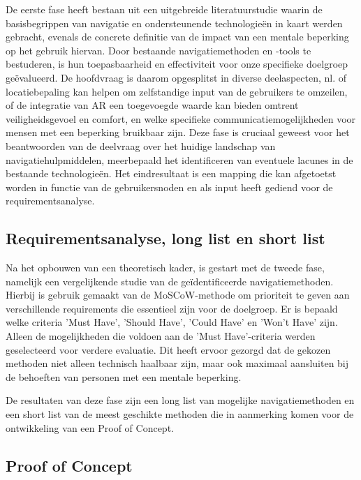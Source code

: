 De eerste fase heeft bestaan uit een uitgebreide literatuurstudie waarin de basisbegrippen van navigatie en ondersteunende technologieën in kaart werden gebracht, evenals de concrete definitie van de impact van een mentale beperking op het gebruik hiervan. Door bestaande navigatiemethoden en -tools te bestuderen, is hun toepasbaarheid en effectiviteit voor onze specifieke doelgroep geëvalueerd. De hoofdvraag is daarom opgesplitst in diverse deelaspecten, nl. of locatiebepaling kan helpen om zelfstandige input van de gebruikers te omzeilen, of de integratie van AR een toegevoegde waarde kan bieden omtrent veiligheidsgevoel en comfort, en welke specifieke communicatiemogelijkheden voor mensen met een beperking bruikbaar zijn. Deze fase is cruciaal geweest voor het beantwoorden van de deelvraag over het huidige landschap van navigatiehulpmiddelen, meerbepaald het identificeren van eventuele lacunes in de bestaande technologieën. Het eindresultaat is een mapping die kan afgetoetst worden in functie van de gebruikersnoden en als input heeft gediend voor de requirementsanalyse.

\subsection*{Requirementsanalyse, long list en short list}

Na het opbouwen van een theoretisch kader, is gestart met de tweede fase, namelijk een vergelijkende studie van de geïdentificeerde navigatiemethoden. Hierbij is gebruik gemaakt van de MoSCoW-methode om prioriteit te geven aan verschillende requirements die essentieel zijn voor de doelgroep. Er is bepaald welke criteria 'Must Have', 'Should Have', 'Could Have' en 'Won't Have' zijn. Alleen de mogelijkheden die voldoen aan de 'Must Have'-criteria werden geselecteerd voor verdere evaluatie. Dit heeft ervoor gezorgd dat de gekozen methoden niet alleen technisch haalbaar zijn, maar ook maximaal aansluiten bij de behoeften van personen met een mentale beperking.

De resultaten van deze fase zijn een long list van mogelijke navigatiemethoden en een short list van de meest geschikte methoden die in aanmerking komen voor de ontwikkeling van een Proof of Concept.

\subsection*{Proof of Concept}

